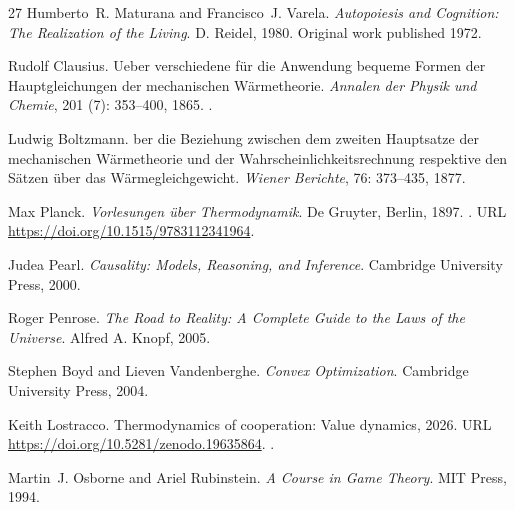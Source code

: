 \documentclass[11pt]{article}
\theoremstyle{plain}
\theoremstyle{definition}
\theoremstyle{remark}
\begin{document}
\begin{thebibliography}{27}
Humberto~R. Maturana and Francisco~J. Varela.
\newblock \emph{Autopoiesis and Cognition: The Realization of the Living}.
\newblock D. Reidel, 1980.
\newblock Original work published 1972.

Rudolf Clausius.
\newblock Ueber verschiedene f{\"u}r die {Anwendung} bequeme {Formen} der
  {Hauptgleichungen} der mechanischen {W{\"a}rmetheorie}.
\newblock \emph{Annalen der Physik und Chemie}, 201 (7):
  353--400, 1865.
\newblock {}.

Ludwig Boltzmann.
ber die {Beziehung} zwischen dem zweiten {Hauptsatze} der
  mechanischen {W{\"a}rmetheorie} und der {Wahrscheinlichkeitsrechnung}
  respektive den {S{\"a}tzen} {\"u}ber das {W{\"a}rmegleichgewicht}.
\newblock \emph{Wiener Berichte}, 76: 373--435, 1877.

Max Planck.
\newblock \emph{Vorlesungen {\"u}ber Thermodynamik}.
\newblock De Gruyter, Berlin, 1897.
\newblock {}.
\newblock URL \url{https://doi.org/10.1515/9783112341964}.

Judea Pearl.
\newblock \emph{Causality: Models, Reasoning, and Inference}.
\newblock Cambridge University Press, 2000.

Roger Penrose.
\newblock \emph{The Road to Reality: A Complete Guide to the Laws of the
  Universe}.
\newblock Alfred A. Knopf, 2005.

Stephen Boyd and Lieven Vandenberghe.
\newblock \emph{Convex Optimization}.
\newblock Cambridge University Press, 2004.

Keith Lostracco.
\newblock Thermodynamics of cooperation: Value dynamics, 2026{}.
\newblock URL \url{https://doi.org/10.5281/zenodo.19635864}.
\newblock {}.

Martin~J. Osborne and Ariel Rubinstein.
\newblock \emph{A Course in Game Theory}.
\newblock MIT Press, 1994.

\end{thebibliography}
\end{document}

